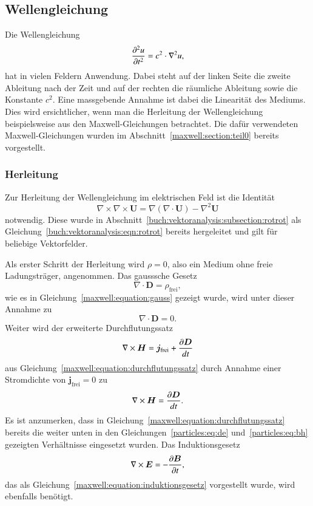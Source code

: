 \subsection{Wellengleichung}\label{particles:section:lin-medium:wellengleichung}
Die Wellengleichung 
\begin{equation}
    \frac{\d^2 u}{\d t^2} = c^2 \cdot \nabla^2 u, \label{particles:eq:wellengleichung}
\end{equation}
%
hat in vielen Feldern Anwendung.
Dabei steht auf der linken Seite die zweite Ableitung nach der Zeit und auf der rechten die räumliche Ableitung sowie die Konstante $c^2$.
Eine massgebende Annahme ist dabei die Linearität des Mediums.
Dies wird ersichtlicher, wenn man die Herleitung der Wellengleichung beispielsweise aus den Maxwell-Gleichungen betrachtet.
Die dafür verwendeten Maxwell-Gleichungen wurden im Abschnitt~\ref{maxwell:section:teil0} bereits vorgestellt.
%


\subsubsection{Herleitung}
Zur Herleitung der Wellengleichung im elektrischen Feld ist die Identität
\begin{equation}
    \nabla \times \nabla \times \boldsymbol{U} = \nabla(\nabla \cdot \boldsymbol{U}) - \nabla^2 \boldsymbol{U}\label{particles:eq:rot-identity}
\end{equation}
notwendig. 
Diese wurde in Abschnitt~\ref{buch:vektoranalysis:subsection:rotrot} als Gleichung~\eqref{buch:vektoranalysis:eqn:rotrot} bereits hergeleitet und gilt für beliebige Vektorfelder.

Als erster Schritt der Herleitung wird $\rho = 0$, also ein Medium ohne freie Ladungsträger, angenommen.
Das gausssche Gesetz
%
\[
    \nabla \cdot \boldsymbol{D} = \rho_\text{frei},
\]
wie es in Gleichung~\eqref{maxwell:equation:gauss} gezeigt wurde, wird unter dieser Annahme zu
\begin{equation}
    \nabla \cdot \boldsymbol{D} = 0.\label{particles:eq:gauss}
\end{equation}
Weiter wird der erweiterte Durchflutungssatz
%
\[
    \nabla \times \boldsymbol{H} = \boldsymbol{j}_\text{frei} + \frac{\d \boldsymbol{D}}{dt}
\]
aus Gleichung~\eqref{maxwell:equation:durchflutungssatz} durch Annahme einer Stromdichte von $\boldsymbol{j}_\text{frei} = 0$ zu
\begin{equation}
    \nabla \times \boldsymbol{H} = \frac{\d \boldsymbol{D}}{dt}.\label{particles:eq:durchflutungssatz}
\end{equation}
Es ist anzumerken, dass in Gleichung~\eqref{maxwell:equation:durchflutungssatz} bereits die weiter unten in den Gleichungen~\eqref{particles:eq:de} und~\eqref{particles:eq:bh} gezeigten Verhältnisse eingesetzt wurden.
Das Induktionsgesetz
%
\begin{equation}
    \nabla \times \boldsymbol{E} = -\frac{\d \boldsymbol{B}}{\d t}\label{particles:eq:induktionsgesetz},
\end{equation}
das als Gleichung~\eqref{maxwell:equation:induktionsgesetz} vorgestellt wurde, wird ebenfalls benötigt.

